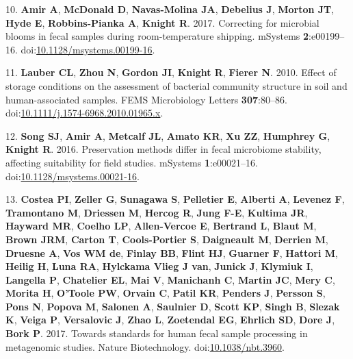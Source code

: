 \documentclass[11pt,]{article}
\begin{document}
\leavevmode\hypertarget{ref-Amir2017b}{}%
10. \textbf{Amir A}, \textbf{McDonald D}, \textbf{Navas-Molina JA},
\textbf{Debelius J}, \textbf{Morton JT}, \textbf{Hyde E},
\textbf{Robbins-Pianka A}, \textbf{Knight R}. 2017. Correcting for
microbial blooms in fecal samples during room-temperature shipping.
mSystems \textbf{2}:e00199--16.
doi:\href{https://doi.org/10.1128/msystems.00199-16}{10.1128/msystems.00199-16}.

\leavevmode\hypertarget{ref-Lauber2010}{}%
11. \textbf{Lauber CL}, \textbf{Zhou N}, \textbf{Gordon JI},
\textbf{Knight R}, \textbf{Fierer N}. 2010. Effect of storage conditions
on the assessment of bacterial community structure in soil and
human-associated samples. FEMS Microbiology Letters \textbf{307}:80--86.
doi:\href{https://doi.org/10.1111/j.1574-6968.2010.01965.x}{10.1111/j.1574-6968.2010.01965.x}.

\leavevmode\hypertarget{ref-Song2016}{}%
12. \textbf{Song SJ}, \textbf{Amir A}, \textbf{Metcalf JL},
\textbf{Amato KR}, \textbf{Xu ZZ}, \textbf{Humphrey G}, \textbf{Knight
R}. 2016. Preservation methods differ in fecal microbiome stability,
affecting suitability for field studies. mSystems \textbf{1}:e00021--16.
doi:\href{https://doi.org/10.1128/msystems.00021-16}{10.1128/msystems.00021-16}.

\leavevmode\hypertarget{ref-Costea2017}{}%
13. \textbf{Costea PI}, \textbf{Zeller G}, \textbf{Sunagawa S},
\textbf{Pelletier E}, \textbf{Alberti A}, \textbf{Levenez F},
\textbf{Tramontano M}, \textbf{Driessen M}, \textbf{Hercog R},
\textbf{Jung F-E}, \textbf{Kultima JR}, \textbf{Hayward MR},
\textbf{Coelho LP}, \textbf{Allen-Vercoe E}, \textbf{Bertrand L},
\textbf{Blaut M}, \textbf{Brown JRM}, \textbf{Carton T},
\textbf{Cools-Portier S}, \textbf{Daigneault M}, \textbf{Derrien M},
\textbf{Druesne A}, \textbf{Vos WM de}, \textbf{Finlay BB},
\textbf{Flint HJ}, \textbf{Guarner F}, \textbf{Hattori M},
\textbf{Heilig H}, \textbf{Luna RA}, \textbf{Hylckama Vlieg J van},
\textbf{Junick J}, \textbf{Klymiuk I}, \textbf{Langella P},
\textbf{Chatelier EL}, \textbf{Mai V}, \textbf{Manichanh C},
\textbf{Martin JC}, \textbf{Mery C}, \textbf{Morita H}, \textbf{O'Toole
PW}, \textbf{Orvain C}, \textbf{Patil KR}, \textbf{Penders J},
\textbf{Persson S}, \textbf{Pons N}, \textbf{Popova M}, \textbf{Salonen
A}, \textbf{Saulnier D}, \textbf{Scott KP}, \textbf{Singh B},
\textbf{Slezak K}, \textbf{Veiga P}, \textbf{Versalovic J}, \textbf{Zhao
L}, \textbf{Zoetendal EG}, \textbf{Ehrlich SD}, \textbf{Dore J},
\textbf{Bork P}. 2017. Towards standards for human fecal sample
processing in metagenomic studies. Nature Biotechnology.
doi:\href{https://doi.org/10.1038/nbt.3960}{10.1038/nbt.3960}.
\end{document}
